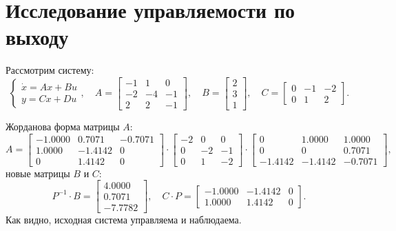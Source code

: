 \section{Исследование управляемости по выходу}

Рассмотрим систему:
\begin{equation*}
    \begin{cases}
        \dot x = Ax + Bu\\
        y = Cx + Du
    \end{cases},\quad
    A=\begin{bmatrix}
        -1 & 1 & 0 \\ -2 & -4 & -1 \\ 2 & 2 & -1
    \end{bmatrix},\quad
    B=\begin{bmatrix}
        2 \\ 3 \\ 1
    \end{bmatrix},\quad
    C=\begin{bmatrix}
        0 & -1 & -2 \\
        0 & 1 & 2
    \end{bmatrix}.
\end{equation*}

Жорданова форма матрицы $A$:
\begin{equation*}
    A=\begin{bmatrix}
        -1.0000&    0.7071 &  -0.7071\\
        1.0000  & -1.4142 &        0\\
             0   & 1.4142&         0
    \end{bmatrix}\cdot
    \begin{bmatrix}
        -2&     0 &    0\\
        0  &  -2 &   -1\\
        0   &  1&    -2
    \end{bmatrix}\cdot
    \begin{bmatrix}
        0&    1.0000  &  1.0000\\
        0 &        0 &   0.7071\\
  -1.4142  & -1.4142&   -0.7071
    \end{bmatrix},
\end{equation*}
новые матрицы $B$ и $C$:
\begin{equation*}
    P^{-1}\cdot B=\begin{bmatrix}
        4.0000\\
        0.7071\\
       -7.7782
    \end{bmatrix},\quad
    C\cdot P=\begin{bmatrix}
        -1.0000&   -1.4142&         0\\
        1.0000  &  1.4142&         0
    \end{bmatrix}.
\end{equation*}
Как видно, исходная система управляема и наблюдаема.

